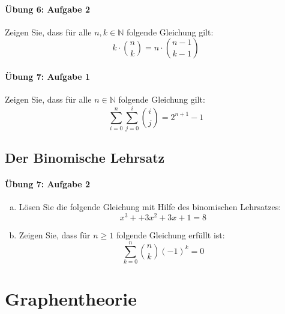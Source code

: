 \documentclass
[
  draft    = true,
  fontsize = 11pt,
  parskip  = half-,
  BCOR     = 0pt,
  DIV      = 11,
  ngerman,
  dvipsnames
]
{scrartcl}
\begin{document}
\paragraph{Übung 6: Aufgabe 2}
Zeigen Sie, dass für alle $n,k\in\mathbb{N}$ folgende Gleichung gilt:
\begin{equation*}
  k\cdot\binom{n}{k}=n\cdot\binom{n-1}{k-1}
\end{equation*}

\paragraph{Übung 7: Aufgabe 1}
Zeigen Sie, dass für alle $n\in\mathbb{N}$ folgende Gleichung gilt:
\begin{equation*}
  \sum_{i=0}^{n}\sum_{j=0}^{i}\binom{i}{j}=2^{n+1}-1
\end{equation*}

\subsection{Der Binomische Lehrsatz}

\paragraph{Übung 7: Aufgabe 2}
\begin{enumerate}[a)]
  \item Lösen Sie die folgende Gleichung mit Hilfe des binomischen Lehrsatzes:
        \begin{equation*}
          x^3++3x^2+3x+1=8
        \end{equation*}
  \item Zeigen Sie, dass für $n\geq1$ folgende Gleichung erfüllt ist:
        \begin{equation*}
          \sum_{k=0}^{n}\binom{n}{k}(-1)^k=0
        \end{equation*}
\end{enumerate}

\section{Graphentheorie}

\end{document}

